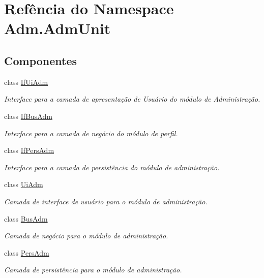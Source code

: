 \hypertarget{namespaceAdm_1_1AdmUnit}{\section{Refência do Namespace Adm.\-Adm\-Unit}
\label{namespaceAdm_1_1AdmUnit}
}
\subsection*{Componentes}
\begin{DoxyCompactItemize}
\item 
class \hyperlink{classAdm_1_1AdmUnit_1_1IfUiAdm}{If\-Ui\-Adm}
\begin{DoxyCompactList}\small\item\em Interface para a camada de apresentação de Usuário do módulo de Administração. \end{DoxyCompactList}\item 
class \hyperlink{classAdm_1_1AdmUnit_1_1IfBusAdm}{If\-Bus\-Adm}
\begin{DoxyCompactList}\small\item\em Interface para a camada de negócio do módulo de perfil. \end{DoxyCompactList}\item 
class \hyperlink{classAdm_1_1AdmUnit_1_1IfPersAdm}{If\-Pers\-Adm}
\begin{DoxyCompactList}\small\item\em Interface para a camada de persistência do módulo de administração. \end{DoxyCompactList}\item 
class \hyperlink{classAdm_1_1AdmUnit_1_1UiAdm}{Ui\-Adm}
\begin{DoxyCompactList}\small\item\em Camada de interface de usuário para o módulo de administração. \end{DoxyCompactList}\item 
class \hyperlink{classAdm_1_1AdmUnit_1_1BusAdm}{Bus\-Adm}
\begin{DoxyCompactList}\small\item\em Camada de negócio para o módulo de administração. \end{DoxyCompactList}\item 
class \hyperlink{classAdm_1_1AdmUnit_1_1PersAdm}{Pers\-Adm}
\begin{DoxyCompactList}\small\item\em Camada de persistência para o módulo de administração. \end{DoxyCompactList}\end{DoxyCompactItemize}
